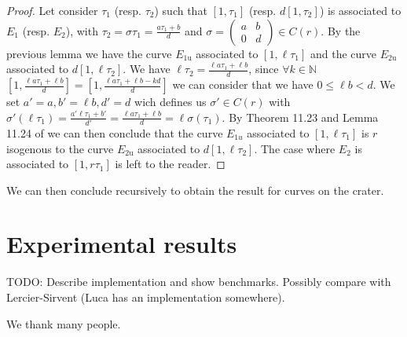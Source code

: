 \documentclass{lms}
\newcommand{\todo}[1]{{\color{red}TODO: #1}}
\begin{document}
\begin{proof}
Let consider $\tau_1$ (resp. $\tau_2$)  such that $[1,\tau_1]$ (resp. $d[1,\tau_2]$) is associated to $E_1$ (resp. $E_2$), with $\tau_2=\sigma \tau_1 =\frac{a\tau_1+b}{d}$ and $\sigma =\left(\begin{array}{cc}
a & b\\
0 & d
\end{array}\right) \in C(r)$. 
\newline
By the previous lemma we have the curve $E_{1\mathrm{u}}$ associated to $[1,\ell \tau_1]$ and the curve $E_{2\mathrm{u}}$ associated to $d[1,\ell \tau_2]$.
\newline
We have $\ell \tau_2=\frac{\ell a\tau_1+\ell b}{d}$, since $\forall k \in \mathbb{N}$ $[1,\frac{\ell a\tau_1+\ell b}{d}]=[1,\frac{\ell a\tau_1+\ell b-kd}{d}]$ we can consider that we have $0 \leqslant \ell b<d$.
We set $a'=a, b'=\ell b, d'=d$ wich defines us $\sigma' \in C(r)$ with $\sigma'(\ell \tau_1)=\frac{a'\ell \tau_1+ b'}{d'}=\frac{\ell a\tau_1+\ell b}{d}=\ell \sigma(\tau_1)$. By Theorem 11.23 and Lemma 11.24 of \cite{Cox89} we can then conclude that the curve $E_{1u}$ associated to $[1,\ell \tau_1]$ is $r$ isogenous to the curve $E_{2\mathrm{u}}$ associated to $d[1,\ell \tau_2]$. The case where $E_2$ is associated to $[1,r\tau_1]$ is left to the reader. %
\end{proof}
 We can then conclude recursively to obtain the result for curves on the crater.





\section{Experimental results}
\label{sec:implem}

\todo{Describe implementation and show benchmarks. Possibly compare
  with Lercier-Sirvent (Luca has an implementation somewhere).}

\begin{acknowledgements}
  We thank many people.
\end{acknowledgements}



\end{document}
